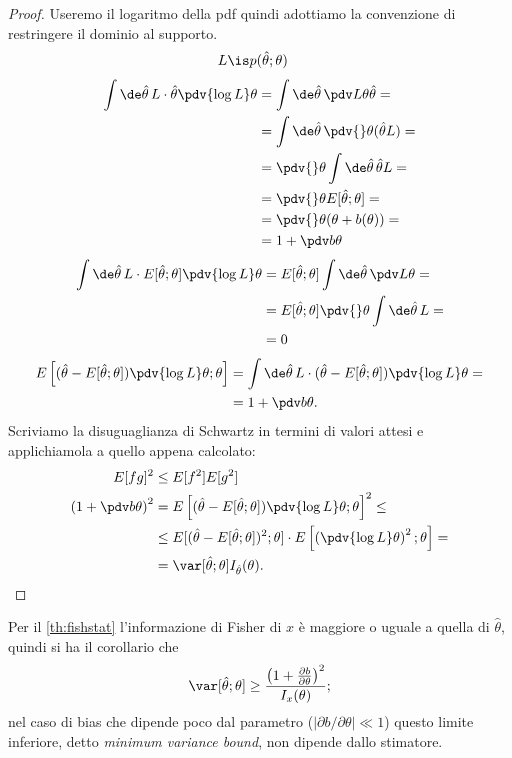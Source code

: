 \begin{proof}
	Useremo il logaritmo della pdf quindi adottiamo la convenzione di restringere il dominio al supporto.
	\begin{align*}
		L &\is p(\hat\theta;\theta)
	\end{align*}
	\begin{align*}
		\int \de\hat\theta\,
		L \cdot \hat\theta \pdv{\log L}\theta 
		&= \int \de\hat\theta\,
		\pdv L\theta \hat\theta = \\
		&= \int \de\hat\theta\,
		\pdv{}\theta (\hat\theta L) = \\
		&= \pdv{}\theta \int \de\hat\theta\, \hat\theta L = \\
		&= \pdv{}\theta E[\hat\theta;\theta] = \\
		&= \pdv{}\theta (\theta + b(\theta)) = \\
		&= 1 + \pdv b\theta
	\end{align*}
	\begin{align*}
		\int \de\hat\theta\,
		L \cdot E[\hat\theta;\theta] \pdv{\log L}\theta
		&= E[\hat\theta;\theta] \int \de\hat\theta\, \pdv L\theta = \\
		&= E[\hat\theta;\theta] \pdv{}\theta \int \de\hat\theta\, L = \\
		&= 0
	\end{align*}
	\begin{align*}
		E \left[ (\hat\theta - E[\hat\theta;\theta]) \pdv{\log L}\theta;\theta \right]
		&= \int \de\hat\theta\, L \cdot
		(\hat\theta - E[\hat\theta;\theta]) \pdv{\log L}\theta = \\
		&= 1 + \pdv b\theta.
	\end{align*}
	Scriviamo la disuguaglianza di Schwartz in termini di valori attesi
	e applichiamola a quello appena calcolato:
	\begin{align*}
		E[fg]^2 &\le E[f^2]E[g^2] \\
		\left( 1 + \pdv b\theta \right)^2
		&= E \left[ (\hat\theta - E[\hat\theta;\theta]) \pdv{\log L}\theta;\theta \right]^2 \le \\
		&\le E[(\hat\theta - E[\hat\theta;\theta])^2;\theta]
		\cdot E \left[ \left( \pdv{\log L}\theta \right)^2;\theta \right] = \\
		&= \var[\hat\theta;\theta] I_{\hat\theta}(\theta). \qedhere
	\end{align*}
\end{proof}

Per il \autoref{th:fishstat} l'informazione di Fisher di $x$ è maggiore o uguale a quella di $\hat\theta$,
quindi si ha il corollario che
\begin{equation*}
	\var[\hat\theta;\theta] \ge \frac{\left( 1 + \frac{\partial b}{\partial\theta} \right)^2}{I_x(\theta)};
\end{equation*}
nel caso di bias che dipende poco dal parametro ($|\partial b/\partial\theta| \ll 1$)
questo limite inferiore, detto \emph{minimum variance bound}, non dipende dallo stimatore.

